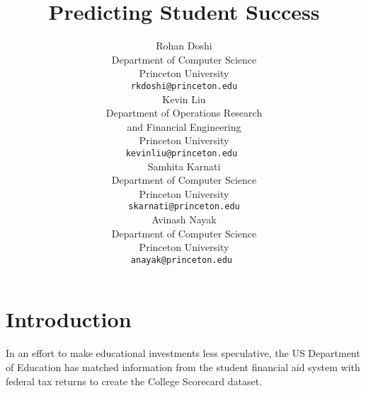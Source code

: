 \documentclass{article} %
\title{Predicting Student Success}
\author{
Rohan Doshi\\
Department of Computer Science\\
Princeton University\\
\texttt{rkdoshi@princeton.edu} \\
\And
Kevin Liu  \\
Department of Operations Research \\ and Financial Engineering \\
Princeton University\\
\texttt{kevinliu@princeton.edu } \\
\And
Samhita Karnati \\
Department of Computer Science\\
Princeton University\\
\texttt{skarnati@princeton.edu} \\
\And
Avinash Nayak  \\
Department of Computer Science\\
Princeton University\\
\texttt{anayak@princeton.edu } \\
}
\begin{document}
\maketitle

\section{Introduction}


In an effort to make educational investments less speculative, the US Department of Education has matched information from the student financial aid system with federal tax returns to create the College Scorecard dataset.

\end{document}

